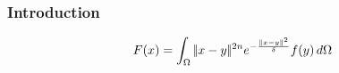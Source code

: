 \begin{frame}
\frametitle{Introduction }
\begin{block}{}
\[ 
F(x) = \int_\Omega |\!| x - y |\!|^{2n} e^{-\frac{|\!| x - y |\!|^2}{\delta}} f(y) \, d\Omega
 \] 
\end{block}

\end{frame}
